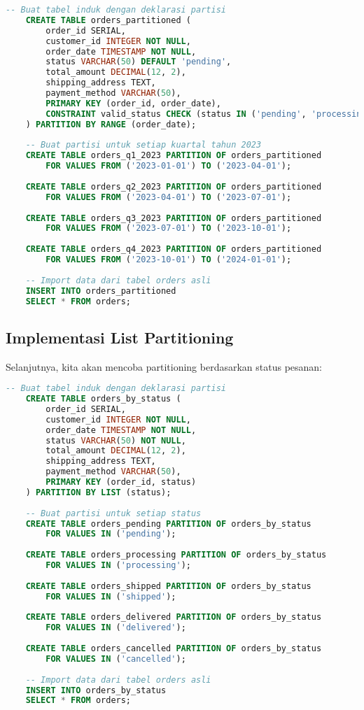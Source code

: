 \begin{lstlisting}[language=SQL]
	-- Buat tabel induk dengan deklarasi partisi
	CREATE TABLE orders_partitioned (
		order_id SERIAL,
		customer_id INTEGER NOT NULL,
		order_date TIMESTAMP NOT NULL,
		status VARCHAR(50) DEFAULT 'pending',
		total_amount DECIMAL(12, 2),
		shipping_address TEXT,
		payment_method VARCHAR(50),
		PRIMARY KEY (order_id, order_date),
		CONSTRAINT valid_status CHECK (status IN ('pending', 'processing', 'shipped', 'delivered', 'cancelled'))
	) PARTITION BY RANGE (order_date);
	
	-- Buat partisi untuk setiap kuartal tahun 2023
	CREATE TABLE orders_q1_2023 PARTITION OF orders_partitioned
		FOR VALUES FROM ('2023-01-01') TO ('2023-04-01');
	
	CREATE TABLE orders_q2_2023 PARTITION OF orders_partitioned
		FOR VALUES FROM ('2023-04-01') TO ('2023-07-01');
	
	CREATE TABLE orders_q3_2023 PARTITION OF orders_partitioned
		FOR VALUES FROM ('2023-07-01') TO ('2023-10-01');
	
	CREATE TABLE orders_q4_2023 PARTITION OF orders_partitioned
		FOR VALUES FROM ('2023-10-01') TO ('2024-01-01');
	
	-- Import data dari tabel orders asli
	INSERT INTO orders_partitioned
	SELECT * FROM orders;
\end{lstlisting}


\subsection{Implementasi List Partitioning}
Selanjutnya, kita akan mencoba partitioning berdasarkan status pesanan:

\begin{lstlisting}[language=SQL]
	-- Buat tabel induk dengan deklarasi partisi
	CREATE TABLE orders_by_status (
		order_id SERIAL,
		customer_id INTEGER NOT NULL,
		order_date TIMESTAMP NOT NULL,
		status VARCHAR(50) NOT NULL,
		total_amount DECIMAL(12, 2),
		shipping_address TEXT,
		payment_method VARCHAR(50),
		PRIMARY KEY (order_id, status)
	) PARTITION BY LIST (status);
	
	-- Buat partisi untuk setiap status
	CREATE TABLE orders_pending PARTITION OF orders_by_status
		FOR VALUES IN ('pending');
	
	CREATE TABLE orders_processing PARTITION OF orders_by_status
		FOR VALUES IN ('processing');
	
	CREATE TABLE orders_shipped PARTITION OF orders_by_status
		FOR VALUES IN ('shipped');
	
	CREATE TABLE orders_delivered PARTITION OF orders_by_status
		FOR VALUES IN ('delivered');
	
	CREATE TABLE orders_cancelled PARTITION OF orders_by_status
		FOR VALUES IN ('cancelled');
	
	-- Import data dari tabel orders asli
	INSERT INTO orders_by_status
	SELECT * FROM orders;
\end{lstlisting}

